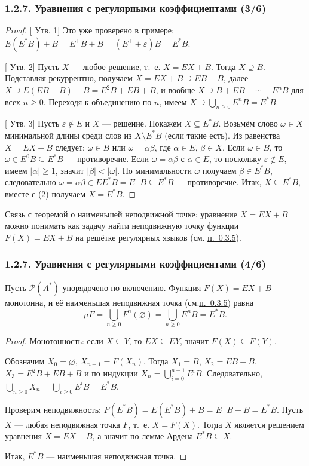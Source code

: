 \documentclass[mathserif,12pt,aspectratio=169]{beamer}
\let\ge\geqslant
\def\proofsection#1{\par{\color{brown}\sffamily\small  [\;}{\sffamily\small\color{brown} #1}{\sffamily\small\color{brown}\;]}\;}
\def\DMref#1#2{{\color{blue}\underline{\hyperlink{#2}{#1}}}}
\begin{document}
\begin{frame}
\frametitle{1.2.7. Уравнения с регулярными коэффициентами (3/6)}


\begin{proof}
\proofsection{Утв. 1}
Это уже проверено в примере: $E(E^*B)+B=E^+B+B=(E^++\varepsilon)B=E^*B$.

\proofsection{Утв. 2} 
Пусть $X$ --- любое решение, т.~е. $X=EX+B$.
Тогда $X\supseteq B$.
Подставляя рекуррентно, получаем
$X=EX+B\supseteq EB + B$,
далее $X\supseteq E(EB+B)+B=E^2B+EB+B$, и вообще
$X\supseteq B+EB+\cdots+E^nB$ для всех $n\ge 0$.
Переходя к объединению по $n$, имеем $X\supseteq \bigcup_{n\ge 0}E^nB=E^*B$.

\proofsection{Утв. 3} 
Пусть $\varepsilon\notin E$ и $X$ --- решение.
Покажем $X\subseteq E^*B$.
Возьмём слово $\omega\in X$ минимальной длины среди слов из $X\setminus E^*B$ (если такие есть).
Из равенства $X=EX+B$ следует: $\omega\in B$ или $\omega=\alpha\beta$, где $\alpha\in E$, $\beta\in X$.
Если $\omega\in B$, то $\omega\in E^0B\subseteq E^*B$ --- противоречие.
Если $\omega=\alpha\beta$ с $\alpha\in E$, то поскольку $\varepsilon\notin E$, имеем $|\alpha|\ge 1$, значит $|\beta|<|\omega|$.
По минимальности $\omega$ получаем $\beta\in E^*B$, следовательно $\omega=\alpha\beta\in EE^*B=E^+B\subseteq E^*B$ --- противоречие.
Итак, $X\subseteq E^*B$, вместе с (2) получаем $X=E^*B$.
\end{proof}

\begin{digress}
Связь с теоремой о наименьшей неподвижной точке:
уравнение $X=EX+B$ можно понимать как задачу найти неподвижную точку функции
$F(X)=EX+B$ на решётке регулярных языков (см. \DMref{п.~0.3.5}{0.3.5.}).
\end{digress}
\end{frame}

\begin{frame}
\frametitle{1.2.7. Уравнения с регулярными коэффициентами (4/6)}


\begin{theorem}
Пусть $\mathcal{P}(A^*)$ упорядочено по включению.
Функция $F(X)=EX+B$ монотонна, и её наименьшая неподвижная точка (см.\DMref{п.~0.3.5}{0.3.5.}) равна
\[
\mu F=\bigcup_{n\ge 0}F^n(\varnothing)=\bigcup_{n\ge 0}E^nB=E^*B.
\]
\end{theorem}

\begin{proof}
Монотонность: если $X\subseteq Y$, то $EX\subseteq EY$, значит $F(X)\subseteq F(Y)$.

Обозначим $X_0=\varnothing$, $X_{n+1}=F(X_n)$.
Тогда $X_1=B$, $X_2=EB+B$, $X_3=E^2B+EB+B$ и по индукции
$X_n=\bigcup_{i=0}^{n-1}E^iB$.
Следовательно, $\bigcup_{n\ge 0}X_n=\bigcup_{i\ge 0}E^iB=E^*B$.

Проверим неподвижность:
$F(E^*B)=E(E^*B)+B=E^+B+B=E^*B$.
Пусть $X$ --- любая неподвижная точка $F$, т.~е. $X=F(X)$.
Тогда $X$ является решением уравнения $X=EX+B$, а значит по лемме Ардена
$E^*B\subseteq X$.

Итак, $E^*B$ --- наименьшая неподвижная точка.
\end{proof}
\end{frame}
\end{document}
